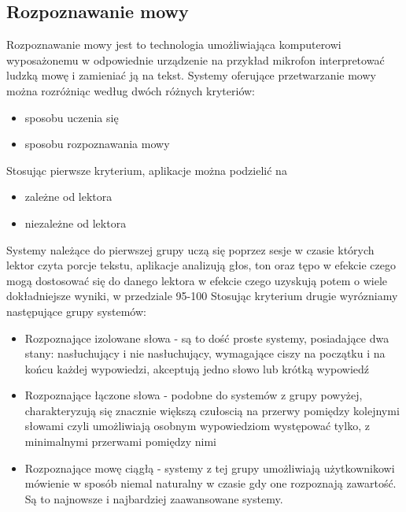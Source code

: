 \subsection{Rozpoznawanie mowy}
Rozpoznawanie mowy jest to technologia umożliwiająca komputerowi wyposażonemu w odpowiednie urządzenie na przykład mikrofon interpretować ludzką mowę i zamieniać ją na tekst. Systemy oferujące przetwarzanie mowy można rozróżniąc według dwóch różnych kryteriów:
\begin{itemize}
	\item sposobu uczenia się
	\item sposobu rozpoznawania mowy
\end{itemize}
Stosując pierwsze kryterium, aplikacje można podzielić na
\begin{itemize}
	\item zależne od lektora
	\item niezależne od lektora
\end{itemize}
Systemy należące do pierwszej grupy uczą się poprzez sesje w czasie których lektor czyta porcje tekstu, aplikacje analizują głos, ton oraz tępo  w efekcie czego mogą dostosować się do danego lektora w efekcie czego uzyskują potem o wiele dokładniejsze wyniki, w przedziale 95-100%
Stosując kryterium drugie wyrózniamy następujące grupy systemów:
\begin{itemize}
	\item Rozpoznające izolowane słowa - są to dość proste systemy, posiadające dwa stany: nasłuchujący i nie nasłuchujący,  wymagające ciszy na początku i na końcu każdej wypowiedzi,  akceptują jedno słowo lub krótką wypowiedź 
	\item Rozpoznające łączone słowa - podobne do systemów z grupy powyżej, charakteryzują się znacznie większą czułoscią na przerwy pomiędzy kolejnymi słowami czyli umożliwiają osobnym wypowiedziom występować tylko, z minimalnymi przerwami pomiędzy nimi
	\item Rozpoznające mowę ciągłą -  systemy z tej grupy umożliwiają użytkownikowi mówienie w sposób niemal naturalny w czasie gdy one rozpoznają zawartość. Są to najnowsze i najbardziej zaawansowane systemy.
\end{itemize}
